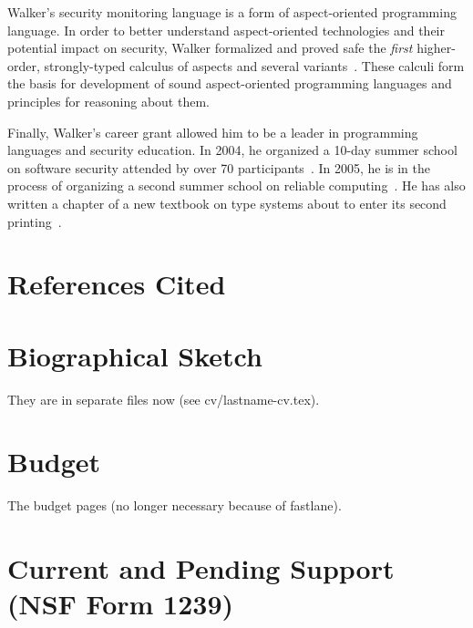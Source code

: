 \documentclass[11pt]{article}
\begin{document}
Walker's security monitoring language is a 
form of aspect-oriented programming language.
In order to better understand aspect-oriented technologies and their
potential impact on security, Walker formalized and proved
safe the {\em first} higher-order, strongly-typed calculus of 
aspects and several 
variants~\cite{walker+:aspects,dantas+:harmless-advice,ligatti+:aspectsjournal,dantas+:polyaml}.
These calculi form the basis for development of sound aspect-oriented
programming languages and principles for reasoning about them.

Finally, Walker's career grant allowed him to be a leader in
programming languages and security education. In 2004, he organized
a 10-day summer school on software security 
attended by over 70 participants~\cite{summerschool04}.  In 2005, he is 
in the process of
organizing a second summer school on reliable computing~\cite{summerschool05}. 
 He has also written a
chapter of a new textbook on type systems about to enter its
second printing~\cite{walker:attapl}.



\newpage
\section{References Cited}
{
 \small
} \newpage
\section{Biographical Sketch}
%

They are in separate files now (see cv/lastname-cv.tex).

\section{Budget}

The budget pages (no longer necessary because of fastlane). 

\section{Current and Pending Support (NSF Form 1239)}
\end{document}

